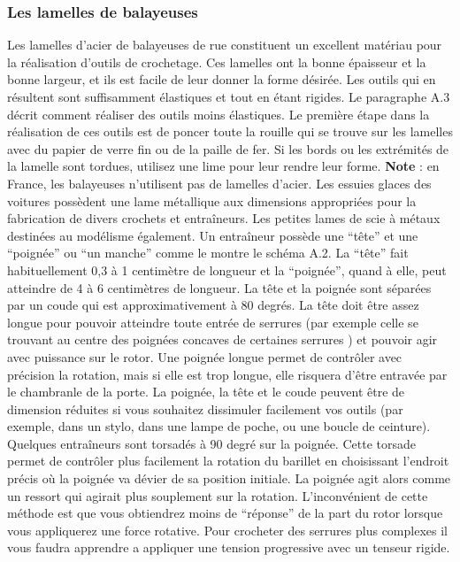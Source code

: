\documentclass[a4paper,french,11pt,twoside]{report}
\begin{document}
\subsubsection{Les lamelles de balayeuses}
Les lamelles d'acier de balayeuses de rue constituent un excellent matériau pour la réalisation d'outils de crochetage. Ces lamelles ont la bonne épaisseur et la bonne largeur, et ils est facile de leur donner la forme désirée. Les outils qui en résultent sont suffisamment élastiques et tout en étant rigides. Le paragraphe A.3 décrit comment réaliser des outils moins élastiques. Le première étape dans la réalisation de ces outils est de poncer toute la rouille qui se trouve sur les lamelles avec du papier de verre fin ou de la paille de fer. Si les bords ou les extrémités de la lamelle sont tordues, utilisez une lime pour leur rendre leur forme.
\medskip
\noindent \textbf{Note} : en France, les balayeuses n'utilisent pas de lamelles d'acier. Les essuies glaces des voitures possèdent une lame métallique aux dimensions appropriées pour la fabrication de divers crochets et entraîneurs. Les petites lames de scie à métaux destinées au modélisme également.
\medskip
Un entraîneur possède une \enquote{tête} et une \enquote{poignée} ou \enquote{un manche} comme le montre le schéma A.2. La \enquote{tête} fait habituellement 0,3 à 1 centimètre de longueur et la \enquote{poignée}, quand à elle, peut atteindre de 4 à 6 centimètres de longueur. La tête et la poignée sont séparées par un coude qui est approximativement à 80 degrés. La tête doit être assez longue pour pouvoir atteindre toute entrée de serrures (par exemple celle se trouvant au centre des poignées concaves de certaines serrures ) et pouvoir agir avec puissance sur le rotor. Une poignée longue permet de contrôler avec précision la rotation, mais si elle est trop longue, elle risquera d'être entravée par le chambranle de la porte. La poignée, la tête et le coude peuvent être de dimension réduites si vous souhaitez dissimuler facilement vos outils (par exemple, dans un stylo, dans une lampe de poche, ou une boucle de ceinture). Quelques entraîneurs sont torsadés à 90 degré sur la poignée. Cette torsade permet de contrôler plus facilement la rotation du barillet en choisissant l'endroit précis où la poignée va dévier de sa position initiale. La poignée agit alors comme un ressort qui agirait plus souplement sur la rotation. L'inconvénient de cette méthode est que vous obtiendrez moins de \enquote{réponse} de la part du rotor lorsque vous appliquerez une force rotative. Pour crocheter des serrures plus complexes il vous faudra apprendre a appliquer une tension progressive avec un tenseur rigide.
\end{document}
